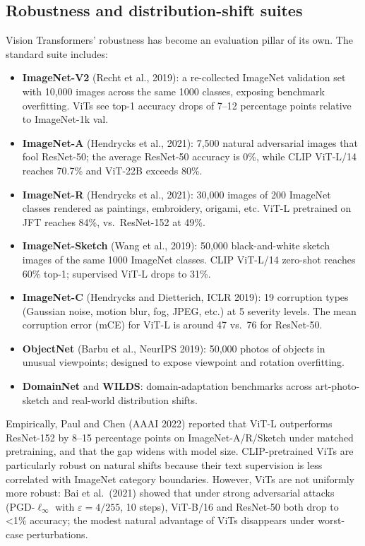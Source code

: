 \subsection{Robustness and distribution-shift suites}\label{robustness-and-distribution-shift-suites}

Vision Transformers' robustness has become an evaluation pillar of its own. The standard suite includes:

\begin{itemize}
\tightlist
\item
  \textbf{ImageNet-V2} (Recht et al., 2019): a re-collected ImageNet validation set with 10,000 images across the same 1000 classes, exposing benchmark overfitting. ViTs see top-1 accuracy drops of 7--12 percentage points relative to ImageNet-1k val.
\item
  \textbf{ImageNet-A} (Hendrycks et al., 2021): 7,500 natural adversarial images that fool ResNet-50; the average ResNet-50 accuracy is 0\%, while CLIP ViT-L/14 reaches 70.7\% and ViT-22B exceeds 80\%.
\item
  \textbf{ImageNet-R} (Hendrycks et al., 2021): 30,000 images of 200 ImageNet classes rendered as paintings, embroidery, origami, etc. ViT-L pretrained on JFT reaches 84\%, vs.~ResNet-152 at 49\%.
\item
  \textbf{ImageNet-Sketch} (Wang et al., 2019): 50,000 black-and-white sketch images of the same 1000 ImageNet classes. CLIP ViT-L/14 zero-shot reaches 60\% top-1; supervised ViT-L drops to 31\%.
\item
  \textbf{ImageNet-C} (Hendrycks and Dietterich, ICLR 2019): 19 corruption types (Gaussian noise, motion blur, fog, JPEG, etc.) at 5 severity levels. The mean corruption error (mCE) for ViT-L is around 47 vs.~76 for ResNet-50.
\item
  \textbf{ObjectNet} (Barbu et al., NeurIPS 2019): 50,000 photos of objects in unusual viewpoints; designed to expose viewpoint and rotation overfitting.
\item
  \textbf{DomainNet} and \textbf{WILDS}: domain-adaptation benchmarks across art-photo-sketch and real-world distribution shifts.
\end{itemize}

Empirically, Paul and Chen (AAAI 2022) reported that ViT-L outperforms ResNet-152 by 8--15 percentage points on ImageNet-A/R/Sketch under matched pretraining, and that the gap widens with model size. CLIP-pretrained ViTs are particularly robust on natural shifts because their text supervision is less correlated with ImageNet category boundaries. However, ViTs are not uniformly more robust: Bai et al.~(2021) showed that under strong adversarial attacks (PGD-\(\ell_\infty\) with \(\varepsilon = 4/255\), 10 steps), ViT-B/16 and ResNet-50 both drop to \textless1\% accuracy; the modest natural advantage of ViTs disappears under worst-case perturbations.

